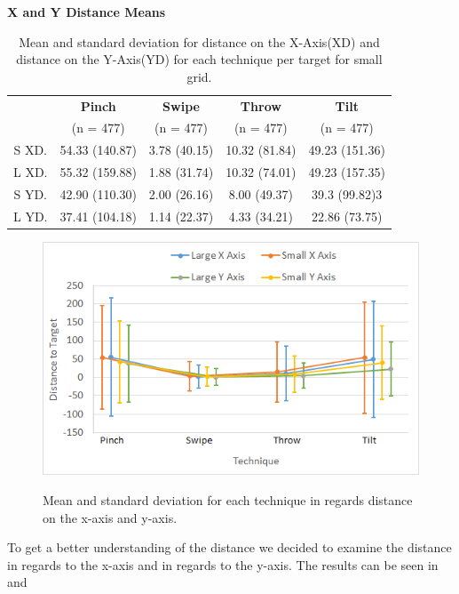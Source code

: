 \begin{table}[H]
	\centering
	\textbf{X and Y Distance Means}\\[4pt]
	\begin{adjustbox}{width=\columnwidth}
	\begin{tabular}{|c|c|c|c|c|}
		\hline
		\rowcolor[HTML]{9B9B9B} 
		& \textbf{Pinch} & \textbf{Swipe} & \textbf{Throw} & \textbf{Tilt} \\
		\rowcolor[HTML]{9B9B9B} 
		& (n = 477) & (n = 477) & (n = 477) & (n = 477) \\ \hline
		S XD. & 54.33 (140.87) & 3.78 (40.15) & 10.32 (81.84) & 49.23 (151.36) \\ \hline
		L XD. & 55.32 (159.88) & 1.88 (31.74) & 10.32 (74.01) & 49.23 (157.35) \\ \hline
		S YD. & 42.90 (110.30) & 2.00 (26.16) & 8.00 (49.37) & 39.3 (99.82)3 \\ \hline
		L YD. & 37.41 (104.18) & 1.14 (22.37) & 4.33 (34.21) & 22.86 (73.75) \\ \hline
	\end{tabular}
	\end{adjustbox}
	\caption{Mean and standard deviation for distance on the X-Axis(XD) and distance on the Y-Axis(YD) for each technique per target for small grid.}
	\label{tab:distanceXY}
\end{table}

\begin{figure}[H]
	{\includegraphics[width = 1\columnwidth ]{images/distance_axis.png}} 
	\caption{
		Mean and standard deviation for each technique in regards distance on the x-axis and y-axis.
	}
	\label{fig:distanceXYResults}
\end{figure}

To get a better understanding of the distance we decided to examine the distance in regards to the x-axis and in regards to the y-axis.
The results can be seen in  and 


